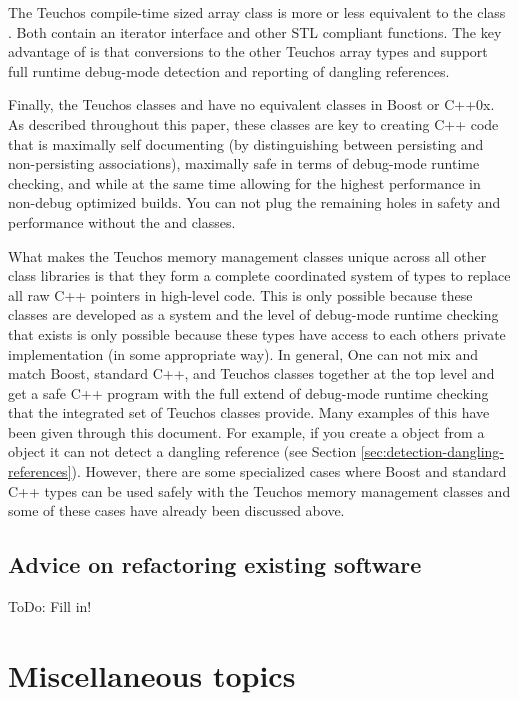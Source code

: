 \documentclass[pdf,ps2pdf,11pt]{SANDreport}
\begin{document}
The Teuchos compile-time sized array class {} is more or
less equivalent to the class {}.  Both contain an
iterator interface and other STL compliant functions.  The key
advantage of {} is that conversions to the other Teuchos
array types {} and {} support full
runtime debug-mode detection and reporting of dangling references.

Finally, the Teuchos classes {} and {} have no
equivalent classes in Boost or C++0x.  As described throughout this
paper, these classes are key to creating C++ code that is maximally
self documenting (by distinguishing between persisting and
non-persisting associations), maximally safe in terms of debug-mode
runtime checking, and while at the same time allowing for the highest
performance in non-debug optimized builds.  You can not plug the
remaining holes in safety and performance without the {} and
{} classes.

What makes the Teuchos memory management classes unique across all
other class libraries is that they form a complete coordinated system
of types to replace all raw C++ pointers in high-level code.  This is
only possible because these classes are developed as a system and the
level of debug-mode runtime checking that exists is only possible
because these types have access to each others private implementation
(in some appropriate way).  In general, One can not mix and match
Boost, standard C++, and Teuchos classes together at the top level and
get a safe C++ program with the full extend of debug-mode runtime
checking that the integrated set of Teuchos classes provide.  Many
examples of this have been given through this document.  For example,
if you create a {} object from a {}
object it can not detect a dangling reference (see Section
{}\ref{sec:detection-dangling-references}).  However, there are some
specialized cases where Boost and standard C++ types can be used
safely with the Teuchos memory management classes and some of these
cases have already been discussed above.


%
{}\subsection{Advice on refactoring existing software}
%

ToDo: Fill in!


%
{}\section{Miscellaneous topics}
%
\end{document}
